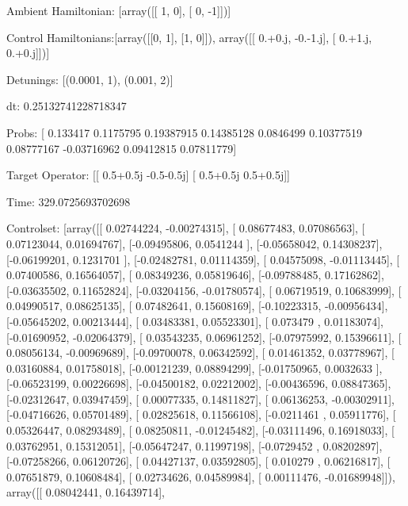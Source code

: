 \documentclass{article}
\begin{document}
    

\newpage

Ambient Hamiltonian: [array([[ 1,  0],
       [ 0, -1]])]

Control Hamiltonians:[array([[0, 1],
       [1, 0]]), array([[ 0.+0.j, -0.-1.j],
       [ 0.+1.j,  0.+0.j]])]

Detunings: [(0.0001, 1), (0.001, 2)]

 dt: 0.25132741228718347

Probs: [ 0.133417    0.1175795   0.19387915  0.14385128  0.0846499   0.10377519
  0.08777167 -0.03716962  0.09412815  0.07811779]

Target Operator: [[ 0.5+0.5j -0.5-0.5j]
 [ 0.5+0.5j  0.5+0.5j]]

Time: 329.0725693702698

Controlset: [array([[ 0.02744224, -0.00274315],
       [ 0.08677483,  0.07086563],
       [ 0.07123044,  0.01694767],
       [-0.09495806,  0.0541244 ],
       [-0.05658042,  0.14308237],
       [-0.06199201,  0.1231701 ],
       [-0.02482781,  0.01114359],
       [ 0.04575098, -0.01113445],
       [ 0.07400586,  0.16564057],
       [ 0.08349236,  0.05819646],
       [-0.09788485,  0.17162862],
       [-0.03635502,  0.11652824],
       [-0.03204156, -0.01780574],
       [ 0.06719519,  0.10683999],
       [ 0.04990517,  0.08625135],
       [ 0.07482641,  0.15608169],
       [-0.10223315, -0.00956434],
       [-0.05645202,  0.00213444],
       [ 0.03483381,  0.05523301],
       [ 0.073479  ,  0.01183074],
       [-0.01690952, -0.02064379],
       [ 0.03543235,  0.06961252],
       [-0.07975992,  0.15396611],
       [ 0.08056134, -0.00969689],
       [-0.09700078,  0.06342592],
       [ 0.01461352,  0.03778967],
       [ 0.03160884,  0.01758018],
       [-0.00121239,  0.08894299],
       [-0.01750965,  0.0032633 ],
       [-0.06523199,  0.00226698],
       [-0.04500182,  0.02212002],
       [-0.00436596,  0.08847365],
       [-0.02312647,  0.03947459],
       [ 0.00077335,  0.14811827],
       [ 0.06136253, -0.00302911],
       [-0.04716626,  0.05701489],
       [ 0.02825618,  0.11566108],
       [-0.0211461 ,  0.05911776],
       [ 0.05326447,  0.08293489],
       [ 0.08250811, -0.01245482],
       [-0.03111496,  0.16918033],
       [ 0.03762951,  0.15312051],
       [-0.05647247,  0.11997198],
       [-0.0729452 ,  0.08202897],
       [-0.07258266,  0.06120726],
       [ 0.04427137,  0.03592805],
       [ 0.010279  ,  0.06216817],
       [ 0.07651879,  0.10608484],
       [ 0.02734626,  0.04589984],
       [ 0.00111476, -0.01689948]]), array([[ 0.08042441,  0.16439714],
\end{document}
